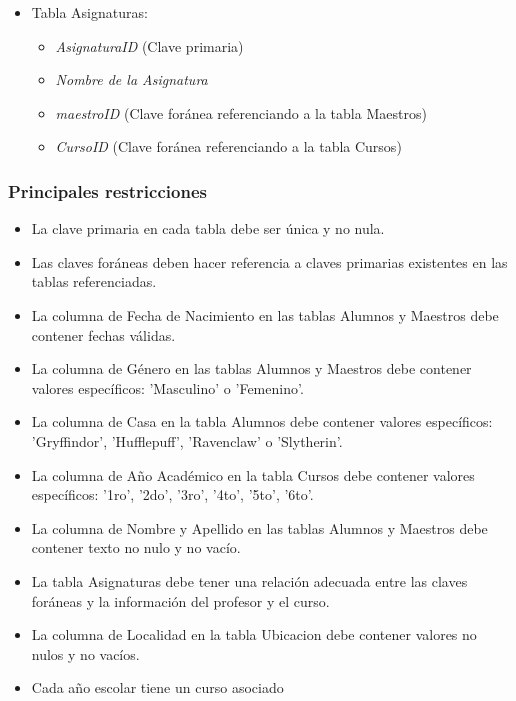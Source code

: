 \begin{itemize}
\begin{itemize}
      \end{itemize}
    \item Tabla Asignaturas:
      \begin{itemize}
        \item \textit{AsignaturaID} (Clave primaria)
        \item \textit{Nombre de la Asignatura}
        \item \textit{maestroID} (Clave foránea referenciando a la tabla Maestros)
        \item \textit{CursoID} (Clave foránea referenciando a la tabla Cursos)
      \end{itemize}
  \end{itemize}

\subsubsection*{Principales restricciones}
\begin{itemize}
    \item La clave primaria en cada tabla debe ser única y no nula.
    \item Las claves foráneas deben hacer referencia a claves primarias existentes en las tablas referenciadas.
    \item La columna de Fecha de Nacimiento en las tablas Alumnos y Maestros debe contener fechas válidas.
    \item La columna de Género en las tablas Alumnos y Maestros debe contener valores específicos: 'Masculino' o 'Femenino'.
    \item La columna de Casa en la tabla Alumnos debe contener valores específicos: 'Gryffindor', 'Hufflepuff', 'Ravenclaw' o 'Slytherin'.
    \item La columna de Año Académico en la tabla Cursos debe contener valores específicos: '1ro', '2do', '3ro', '4to', '5to', '6to'.    
    \item La columna de Nombre y Apellido en las tablas Alumnos y Maestros debe contener texto no nulo y no vacío.
    \item La tabla Asignaturas debe tener una relación adecuada entre las claves foráneas y la información del profesor y el curso.
    \item La columna de Localidad en la tabla Ubicacion debe contener valores no nulos y no vacíos.  
    \item Cada año escolar tiene un curso asociado 
\end{itemize}

